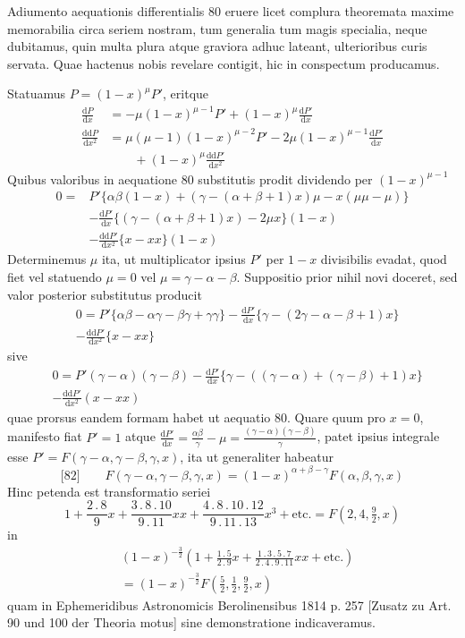 Adiumento aequationis differentialis 80 eruere licet complura theoremata
maxime memorabilia circa seriem nostram, tum generalia tum magis specialia,
neque dubitamus, quin multa plura atque graviora adhuc lateant, ulterioribus
curis servata. Quae hactenus nobis revelare contigit, hic in conspectum
producamus.
\par{}
Statuamus $P=(1-x)^\mu P'$, eritque
\[
\begin{aligned}
\frac{\mathrm{d}P}{\mathrm{d}x}&=-\mu(1-x)^{\mu-1}P'+(1-x)^\mu\frac{\mathrm{d}P'}{\mathrm{d}x}\\
\frac{\mathrm{dd}P}{\mathrm{d}x^2}&=\mu(\mu-1)(1-x)^{\mu-2}P'-2\mu(1-x)^{\mu-1}\frac{\mathrm{d}P'}{\mathrm{d}x}\\&\qquad+(1-x)^\mu\frac{\mathrm{dd}P'}{\mathrm{d}x^2}
\end{aligned}
\]
Quibus valoribus in aequatione 80 substitutis prodit dividendo per $(1-x)^{\mu-1}$
\[
\begin{aligned}
0={}&P'\{\alpha\beta(1-x)+(\gamma-(\alpha+\beta+1)x)\mu-x(\mu\mu-\mu)\}\\
&-\frac{\mathrm{d}P'}{\mathrm{d}x}\{(\gamma-(\alpha+\beta+1)x)-2\mu x\}(1-x)\\&-\frac{\mathrm{dd}P'}{\mathrm{d}x^2}\{x-xx\}(1-x)
\end{aligned}
\]
Determinemus $\mu$ ita, ut multiplicator ipsius $P'$ per $1-x$ divisibilis evadat, quod fiet vel statuendo $\mu=0$ vel $\mu=\gamma-\alpha-\beta$. Suppositio prior nihil novi doceret, sed valor posterior substitutus producit
\[
\begin{aligned}&0=P'\{\alpha\beta-\alpha\gamma-\beta\gamma+\gamma\gamma\}-\frac{\mathrm{d}P'}{\mathrm{d}x}\{\gamma-(2\gamma-\alpha-\beta+1)x\}\\&-\frac{\mathrm{dd}P'}{\mathrm{d}x^2}\{x-xx\}\end{aligned}
\]
sive
\[
\begin{aligned}&0=P'(\gamma-\alpha)(\gamma-\beta)-\frac{\mathrm{d}P'}{\mathrm{d}x}\{\gamma-((\gamma-\alpha)+(\gamma-\beta)+1)x\}\\&-\frac{\mathrm{dd}P'}{\mathrm{d}x^2}(x-xx)\end{aligned}
\]
quae prorsus eandem formam habet ut aequatio 80. Quare quum pro $x=0$, manifesto fiat $P'=1$ atque $\frac{\mathrm{d}P'}{\mathrm{d}x}=\frac{\alpha\beta}{\gamma}-\mu=\frac{(\gamma-\alpha)(\gamma-\beta)}{\gamma}$, patet ipsius integrale esse $P'=F(\gamma-\alpha,\gamma-\beta,\gamma,x)$, ita ut generaliter habeatur
\[
\text{[82]}\qquad F(\gamma-\alpha,\gamma-\beta,\gamma,x)=(1-x)^{\alpha+\beta-\gamma}F(\alpha,\beta,\gamma,x)
\]
Hinc petenda est transformatio seriei
\[
1+\frac{2\,.\,8}{9}x+\frac{3\,.\,8\,.\,10}{9\,.\,11}xx+\frac{4\,.\,8\,.\,10\,.\,12}{9\,.\,11\,.\,13}x^3+\text{etc.}=F(2,4,\tfrac{9}{2},x)
\]
in
\[
\begin{aligned}&(1-x)^{-\frac{3}{2}}\left(1+\frac{1\,.\,5}{2\,.\,9}x+\frac{1\,.\,3\,.\,5\,.\,7}{2\,.\,4\,.\,9\,.\,11}xx+\text{etc.}\right)\\&=(1-x)^{-\frac{3}{2}}F(\tfrac{5}{2},\tfrac{1}{2},\tfrac{9}{2},x)\end{aligned}
\]
quam in Ephemeridibus Astronomicis Berolinensibus 1814 p. 257 [Zusatz zu Art. 90 und 100 der Theoria motus] sine demonstratione indicaveramus.

